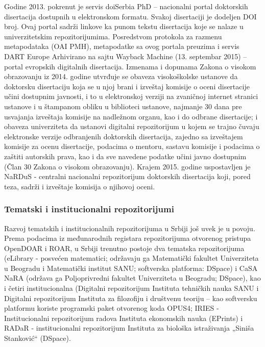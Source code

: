 \documentclass{article}
\begin{document}
Godine 2013. pokrenut je servis doiSerbia PhD – nacionalni portal doktorskih disertacija dostupnih u elektronskom formatu. Svakoj disertaciji je dodeljen DOI broj. Ovaj portal sadrži linkove ka punom tekstu disertacija koje se nalaze u univerzitetskim repozitorijumima. Posredstvom protokola za razmenu metapodataka (OAI PMH), metapodatke sa ovog portala preuzima i servis DART Europe Arhivirano na sajtu Wayback Machine (13. septembar 2015) – portal evropskih digitalnih disertacija. Izmenama i dopunama Zakona o visokom obrazovanju iz 2014. godine utvrđuje se obaveza visokoškolske ustanove da doktorsku disertaciju koja se u njoj brani i izveštaj komisije o oceni disertacije učini dostupnim javnosti, i to u elektronskoj verziji na zvaničnoj internet stranici ustanove i u štampanom obliku u biblioteci ustanove, najmanje 30 dana pre usvajanja izveštaja komisije na nadležnom organu, kao i do odbrane disertacije; i obaveza univerziteta da ustanovi digitalni repozitorijum u kojem se trajno čuvaju elektronske verzije odbranjenih doktorskih disertacija, zajedno sa izveštajem komisije za ocenu disertacije, podacima o mentoru, sastavu komisije i podacima o zaštiti autorskih prava, kao i da sve navedene podatke učini javno dostupnim (Član 30 Zakona o visokom obrazovanju). Krajem 2015. godine uspostavljen je NaRDuS - centralni nacionalni repozitorijum doktorskih disertacija koji, pored teza, sadrži i izveštaje komisija o njihovoj oceni.

\subsubsection{Tematski i institucionalni repozitorijumi}

Razvoj tematskih i institucionalnih repozitorijuma u Srbiji još uvek je u povoju. Prema podacima iz međunarodnih registara repozitorijuma otvorenog pristupa OpenDOAR i ROAR, u Srbiji trenutno postoje dva tematska repozitorijuma (eLibrary - posvećen matematici; održavaju ga Matematički fakultet Univerziteta u Beogradu i Matematički institut SANU; softverska platforma: DSpace) i CaSA NaRA (održava ga Poljoprivredni fakultet Univerziteta u Beogradu; DSpace), kao i četiri institucionalna (Digitalni repozitorijum Instituta tehničkih nauka SANU i Digitalni repozitorijum Instituta za filozofiju i društvenu teoriju – kao softversku platformu koriste programski paket otvorenog koda OPUS4; IRIES - Institucionalni repozitorijum radova Instituta ekonomskih nauka (EPrints) i RADaR - institucionalni repozitorijum Instituta za biološka istraživanja „Siniša Stanković“ (DSpace).
\end{document}
